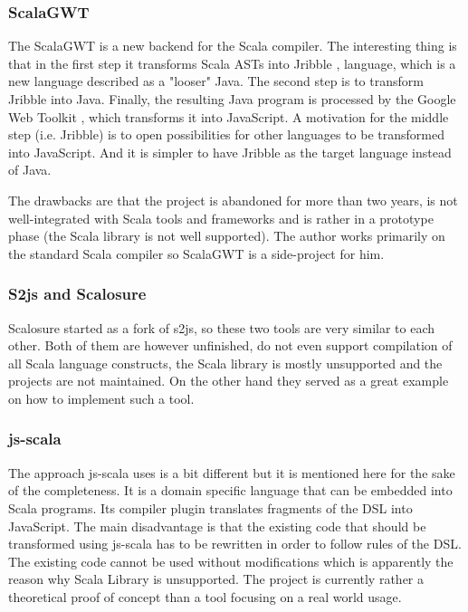 \documentclass[12pt,a4paper]{report}
\begin{document}
\subsubsection*{ScalaGWT}

The ScalaGWT is a new backend for the Scala compiler. The interesting thing is that in the first step it transforms Scala ASTs into Jribble \cite{Jribble}, language, which is a new language described as a "looser" Java. The second step is to transform Jribble into Java. Finally, the resulting Java program is processed by the Google Web Toolkit \cite{Gwt}, which transforms it into JavaScript. A motivation for the middle step (i.e. Jribble) is to open possibilities for other languages to be transformed into JavaScript. And it is simpler to have Jribble as the target language instead of Java.

The drawbacks are that the project is abandoned for more than two years, is not well-integrated with Scala tools and frameworks and is rather in a prototype phase (the Scala library is not well supported). The author works primarily on the standard Scala compiler so ScalaGWT is a side-project for him.

\subsubsection*{S2js and Scalosure}

Scalosure started as a fork of s2js, so these two tools are very similar to each other. Both of them are however unfinished, do not even support compilation of all Scala language constructs, the Scala library is mostly unsupported and the projects are not maintained. On the other hand they served as a great example on how to implement such a tool.

\subsubsection*{js-scala}

The approach js-scala uses is a bit different but it is mentioned here for the sake of the completeness. It is a domain specific language that can be embedded into Scala programs. Its compiler plugin translates fragments of the DSL into JavaScript. The main disadvantage is that the existing code that should be transformed using js-scala has to be rewritten in order to follow rules of the DSL. The existing code cannot be used without modifications which is apparently the reason why Scala Library is unsupported. The project is currently rather a theoretical proof of concept than a tool focusing on a real world usage.
\end{document}

